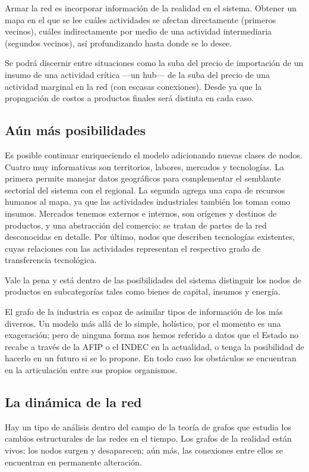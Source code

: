 \documentclass[a4paper]{report}
\begin{document}
Armar la red es incorporar información de la realidad en el sistema. Obtener un mapa en el que se lee cuáles actividades se afectan directamente (primeros vecinos), cuáles indirectamente por medio de una actividad intermediaria (segundos vecinos), así profundizando hasta donde se lo desee.

Se podrá discernir entre situaciones como la suba del precio de importación de un insumo de una actividad crítica —un hub— de la suba del precio de una actividad marginal en la red (con escasas conexiones). Desde ya que la propagación de costos a productos finales será distinta en cada caso.

\subsection*{Aún más posibilidades}

Es posible continuar enriqueciendo el modelo adicionando nuevas clases de nodos. Cuatro muy informativas son territorios, labores, mercados y tecnologías. La primera permite manejar datos geográficos para complementar el semblante sectorial del sistema con el regional. La segunda agrega una capa de recursos humanos al mapa, ya que las actividades industriales también los toman como insumos. Mercados tenemos externos e internos, son orígenes y destinos de productos, y una abstracción del comercio: se tratan de partes de la red desconocidas en detalle. Por último, nodos que describen tecnologías existentes, cuyas relaciones con las actividades representan el respectivo grado de transferencia tecnológica.

Vale la pena y está dentro de las posibilidades del sistema distinguir los nodos de productos en subcategorías tales como bienes de capital, insumos y energía.

El grafo de la industria es capaz de asimilar tipos de información de los más diversos. Un modelo más allá de lo simple, holístico, por el momento es una exageración; pero de ninguna forma nos hemos referido a datos que el Estado no recabe a través de la AFIP o el INDEC en la actualidad, o tenga la posibilidad de hacerlo en un futuro si se lo propone. En todo caso los obstáculos se encuentran en la articulación entre sus propios organismos.

\subsection*{La dinámica de la red}

Hay un tipo de análisis dentro del campo de la teoría de grafos que estudia los cambios estructurales de las redes en el tiempo. Los grafos de la realidad están vivos: los nodos surgen y desaparecen; aún más, las conexiones entre ellos se encuentran en permanente alteración.
\end{document}
